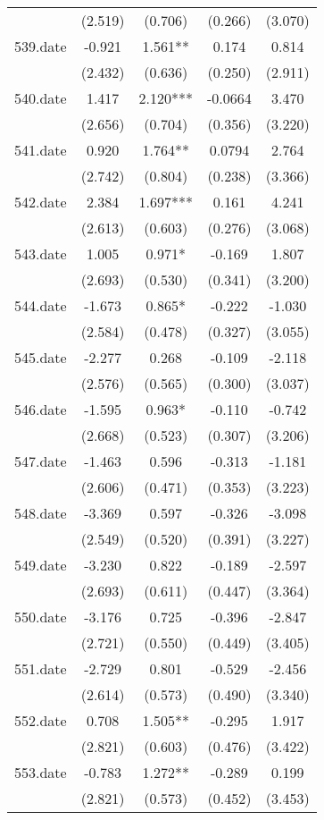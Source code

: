 \documentclass[]{article}
\begin{document}
\begin{tabular}{lcccc}
 & (2.519) & (0.706) & (0.266) & (3.070) \\
539.date & -0.921 & 1.561** & 0.174 & 0.814 \\
 & (2.432) & (0.636) & (0.250) & (2.911) \\
540.date & 1.417 & 2.120*** & -0.0664 & 3.470 \\
 & (2.656) & (0.704) & (0.356) & (3.220) \\
541.date & 0.920 & 1.764** & 0.0794 & 2.764 \\
 & (2.742) & (0.804) & (0.238) & (3.366) \\
542.date & 2.384 & 1.697*** & 0.161 & 4.241 \\
 & (2.613) & (0.603) & (0.276) & (3.068) \\
543.date & 1.005 & 0.971* & -0.169 & 1.807 \\
 & (2.693) & (0.530) & (0.341) & (3.200) \\
544.date & -1.673 & 0.865* & -0.222 & -1.030 \\
 & (2.584) & (0.478) & (0.327) & (3.055) \\
545.date & -2.277 & 0.268 & -0.109 & -2.118 \\
 & (2.576) & (0.565) & (0.300) & (3.037) \\
546.date & -1.595 & 0.963* & -0.110 & -0.742 \\
 & (2.668) & (0.523) & (0.307) & (3.206) \\
547.date & -1.463 & 0.596 & -0.313 & -1.181 \\
 & (2.606) & (0.471) & (0.353) & (3.223) \\
548.date & -3.369 & 0.597 & -0.326 & -3.098 \\
 & (2.549) & (0.520) & (0.391) & (3.227) \\
549.date & -3.230 & 0.822 & -0.189 & -2.597 \\
 & (2.693) & (0.611) & (0.447) & (3.364) \\
550.date & -3.176 & 0.725 & -0.396 & -2.847 \\
 & (2.721) & (0.550) & (0.449) & (3.405) \\
551.date & -2.729 & 0.801 & -0.529 & -2.456 \\
 & (2.614) & (0.573) & (0.490) & (3.340) \\
552.date & 0.708 & 1.505** & -0.295 & 1.917 \\
 & (2.821) & (0.603) & (0.476) & (3.422) \\
553.date & -0.783 & 1.272** & -0.289 & 0.199 \\
 & (2.821) & (0.573) & (0.452) & (3.453) \\

\end{tabular}
\end{document}
